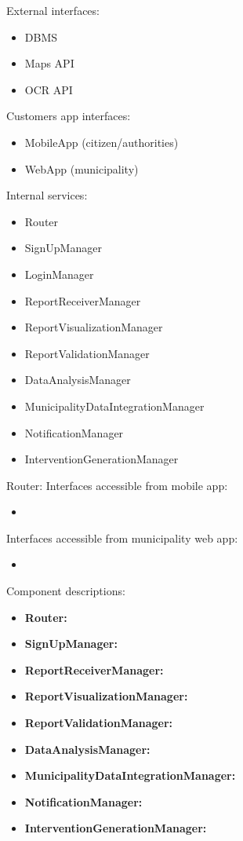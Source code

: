 External interfaces:
\begin{itemize}
	\item DBMS
	\item Maps API
	\item OCR API
\end{itemize}

Customers app interfaces:
\begin{itemize}
	\item MobileApp (citizen/authorities)
	\item WebApp (municipality)
\end{itemize}

Internal services:
\begin{itemize}
	\item Router
	\item SignUpManager
	\item LoginManager
	\item ReportReceiverManager
	\item ReportVisualizationManager
	\item ReportValidationManager
	\item DataAnalysisManager
	\item MunicipalityDataIntegrationManager
	\item NotificationManager
	\item InterventionGenerationManager
\end{itemize}

Router:
Interfaces accessible from mobile app:
\begin{itemize}
	\item 
\end{itemize}
Interfaces accessible from municipality web app:
\begin{itemize}
	\item 
\end{itemize}

Component descriptions:
\begin{itemize}
	\item \textbf{Router:} 
	\item \textbf{SignUpManager:}
	\item \textbf{ReportReceiverManager:}
	\item \textbf{ReportVisualizationManager:}
	\item \textbf{ReportValidationManager:}
	\item \textbf{DataAnalysisManager:}
	\item \textbf{MunicipalityDataIntegrationManager:}
	\item \textbf{NotificationManager:}
	\item \textbf{InterventionGenerationManager:}
\end{itemize}